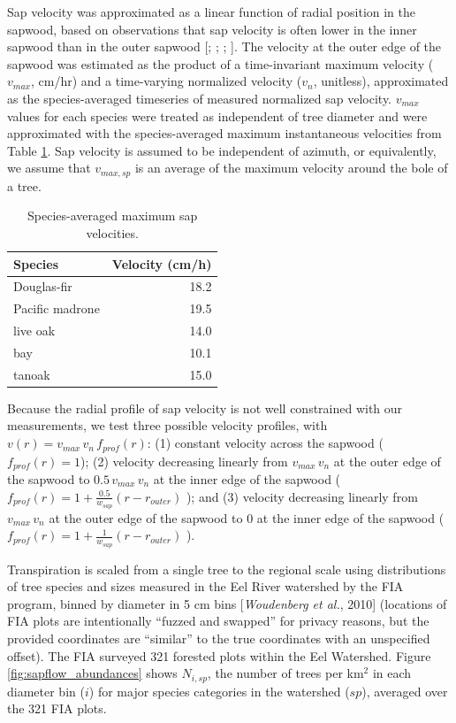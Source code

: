 Sap velocity was approximated as a linear function of radial position in the sapwood, based on observations that sap velocity is often lower in the inner sapwood than in the outer sapwood [\cite{ford2004assessing}; \cite{cohen1985determination}; \cite{vcermak1992radial}; \cite{nadezhdina2002radial}].  The velocity at the outer edge of the sapwood was estimated as the product of a time-invariant maximum velocity ($v_{max}$, cm/hr) and a time-varying normalized velocity ($v_n$, unitless), approximated as the species-averaged timeseries of measured normalized sap velocity.  $v_{max}$ values for each species were treated as independent of tree diameter and were approximated with the species-averaged maximum instantaneous velocities from Table \ref{tbl:sapflow_maxvel}.  Sap velocity is assumed to be independent of azimuth, or equivalently, we assume that $v_{max,sp}$ is an average of the maximum velocity around the bole of a tree.

\begin{table}
  \caption{Species-averaged maximum sap velocities.}
  \label{tbl:sapflow_maxvel}
  \begin{tabular}{l r}
  \hline
  Species & Velocity (cm/h) \\
  \hline
  Douglas-fir & 18.2 \\
  Pacific madrone & 19.5 \\
  live oak & 14.0 \\
  bay & 10.1 \\
  tanoak & 15.0 \\
  \hline
  \end{tabular}
\end{table}

Because the radial profile of sap velocity is not well constrained with our measurements, we test three possible velocity profiles, with $v(r) = v_{max} \, v_n \, f_{prof}(r)$: (1) constant velocity across the sapwood ($f_{prof}(r) = 1$); (2) velocity decreasing linearly from $v_{max} \, v_n$ at the outer edge of the sapwood to $0.5 \, v_{max} \, v_n$ at the inner edge of the sapwood ($f_{prof}(r) = 1+\tfrac{0.5}{w_{sap}}(r-r_{outer})$ ); and (3) velocity decreasing linearly from $v_{max} \, v_n$ at the outer edge of the sapwood to 0 at the inner edge of the sapwood ($f_{prof}(r) = 1+\tfrac{1}{w_{sap}}(r-r_{outer})$ ).

Transpiration is scaled from a single tree to the regional scale using distributions of tree species and sizes measured in the Eel River watershed by the FIA program, binned by diameter in 5 cm bins [\textit{Woudenberg et al.}, 2010] (locations of FIA plots are intentionally ``fuzzed and swapped'' for privacy reasons, but the provided coordinates are ``similar'' to the true coordinates with an unspecified offset).  The FIA surveyed 321 forested plots within the Eel Watershed.  Figure \ref{fig:sapflow_abundances} shows $N_{i,sp}$, the number of trees per km$^2$ in each diameter bin ($i$) for major species categories in the watershed ($sp$), averaged over the 321 FIA plots.

